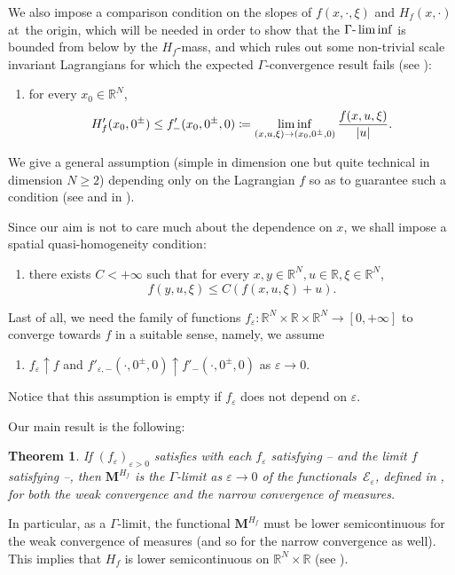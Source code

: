 \documentclass[JEP,XML,SOM,Unicode,published]{cedram}
\theoremstyle{plain}
\newtheorem{theorem}{Theorem}[section]
\theoremstyle{definition}
\newcommand{\R}{\mathbb{R}}
\newcommand{\ener}{\mathcal{E}}
\newcommand{\mass}{\boldsymbol{M}}
\newcommand{\eps}{\varepsilon}
\DeclarePairedDelimiter{\abs}{\lvert}{\rvert}
\begin{document}
We also impose a comparison condition on the slopes of \(f(x,\cdot,\xi)\) and $H_f(x,\cdot)$ at~the origin, which will be needed in order to show that the $\Gamma\textup{-}\liminf$ is bounded from below by the $H_f$-mass, and which rules out some non-trivial scale invariant Lagrangians for which the expected $\Gamma$-convergence result fails (see ):
\begin{enumerate}[\textnormal{(H}$_1$\textnormal{)},leftmargin=1.5\normalparindent,resume]
\item\label{hypSlope} for every $x_0\in \R^N$,
\begin{equation}\label{slopeInfSimplified}
H_f'(x_0,0^\pm) \leq f'_-(x_0,0^\pm,0)\coloneqq\displaystyle\liminf_{(x,u,\xi) \to (x_0,0^\pm,0)} \frac{f(x,u,\xi)}{\abs{u}}.
\end{equation}
\end{enumerate}
We give a general assumption (simple in dimension one but quite technical in dimension $N\geq 2$) depending only on the Lagrangian $f$ so as to guarantee such a condition (see  and  in ).

Since our aim is not to care much about the dependence on \(x\), we shall impose a spatial quasi-homogeneity condition:
\begin{enumerate}[\textnormal{(H}$_1$\textnormal{)},leftmargin=1.5\normalparindent,resume]
\item\label{hypQuasiHomogeneity} there exists $C < +\infty$ such that for every $x,y\in \R^N, u\in \R,\xi \in \R^N$,
\[f(y,u,\xi) \leq C (f(x,u,\xi) + u).\]
\end{enumerate}

Last of all, we need the family of functions $f_\eps:\R^N\times\R\times\R^N\to[0,+\infty]$ to converge towards \(f\) in a suitable sense, namely, we assume
\begin{enumerate}[\textnormal{(H}$_1$\textnormal{)},leftmargin=1.5\normalparindent,resume]
\item\label{hypGammaCv}
$f_\eps \uparrow f$ and $f'_{\eps,-}(\cdot,0^\pm,0) \uparrow f'_-(\cdot,0^\pm,0)$ as $\eps \to 0$.
\end{enumerate}
\noindent Notice that this assumption is empty if $f_\eps$ does not depend on $\eps$.

Our main result is the following:
\begin{theorem}\label{mainGammaConvergence}
If $(f_\eps)_{\eps > 0}$ satisfies  with each \(f_\eps\) satisfying -- and the limit \(f\) satisfying --, then \(\mass^{H_f}\) is the \(\Gamma\)-limit as \(\eps\to 0\) of the functionals~\(\ener_\eps\), defined in , for both the weak convergence and the narrow convergence of measures.
\end{theorem}
In particular, as a \(\Gamma\)-limit, the functional \(\mass^{H_f}\) must be lower semicontinuous for the weak convergence of measures (and so for the narrow convergence as well). This implies that \(H_f\) is lower semicontinuous on \(\R^N\times\R\) (see ).
\end{document}
